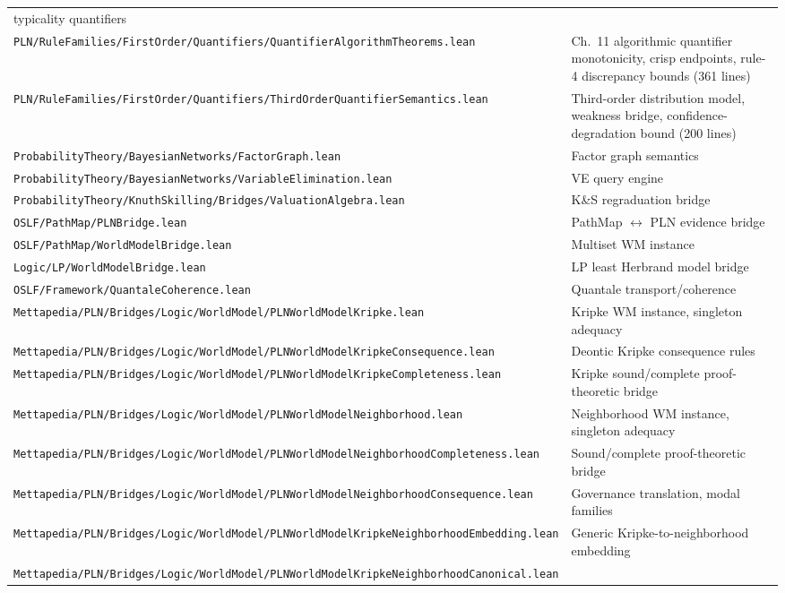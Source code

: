 \documentclass[]{article}
\newcommand{\code}[1]{\texttt{#1}}
\begin{document}
\begin{longtable}{p{}p{}}
  typicality quantifiers \\
\code{PLN/RuleFamilies/FirstOrder/Quantifiers/QuantifierAlgorithmTheorems.lean} &
  Ch.~11 algorithmic quantifier monotonicity, crisp endpoints, rule-4
  discrepancy bounds (361 lines) \\
\code{PLN/RuleFamilies/FirstOrder/Quantifiers/ThirdOrderQuantifierSemantics.lean} &
  Third-order distribution model, weakness bridge,
  confidence-degradation bound (200 lines) \\
\code{ProbabilityTheory/BayesianNetworks/FactorGraph.lean} & Factor graph
  semantics \\
\code{ProbabilityTheory/BayesianNetworks/VariableElimination.lean} & VE
  query engine \\
\code{ProbabilityTheory/KnuthSkilling/Bridges/ValuationAlgebra.lean} &
  K\&S regraduation bridge \\
\code{OSLF/PathMap/PLNBridge.lean} & PathMap $\leftrightarrow$ PLN
  evidence bridge \\
\code{OSLF/PathMap/WorldModelBridge.lean} & Multiset WM instance \\
\code{Logic/LP/WorldModelBridge.lean} & LP least Herbrand model bridge \\
\code{OSLF/Framework/QuantaleCoherence.lean} & Quantale
  transport/coherence \\
\code{Mettapedia/PLN/Bridges/Logic/WorldModel/PLNWorldModelKripke.lean} & Kripke WM instance,
  singleton adequacy \\
\code{Mettapedia/PLN/Bridges/Logic/WorldModel/PLNWorldModelKripkeConsequence.lean} & Deontic Kripke
  consequence rules \\
\code{Mettapedia/PLN/Bridges/Logic/WorldModel/PLNWorldModelKripkeCompleteness.lean} & Kripke
  sound/complete proof-theoretic bridge \\
\code{Mettapedia/PLN/Bridges/Logic/WorldModel/PLNWorldModelNeighborhood.lean} & Neighborhood WM instance,
  singleton adequacy \\
\code{Mettapedia/PLN/Bridges/Logic/WorldModel/PLNWorldModelNeighborhoodCompleteness.lean} &
  Sound/complete proof-theoretic bridge \\
\code{Mettapedia/PLN/Bridges/Logic/WorldModel/PLNWorldModelNeighborhoodConsequence.lean} & Governance
  translation, modal families \\
\code{Mettapedia/PLN/Bridges/Logic/WorldModel/PLNWorldModelKripkeNeighborhoodEmbedding.lean} &
  Generic Kripke-to-neighborhood embedding \\
\code{Mettapedia/PLN/Bridges/Logic/WorldModel/PLNWorldModelKripkeNeighborhoodCanonical.lean} &

\end{longtable}
\end{document}
